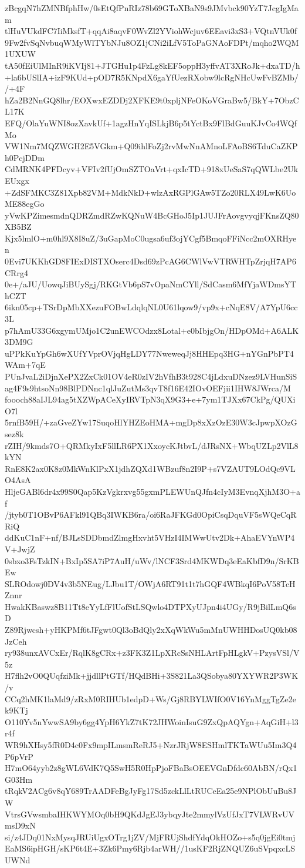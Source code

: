 zBcgqN7hZMNBfphHw/0sEtQfPnRIz78b69GToXBaN9s9JMvbck90YzT7JcgIgMam
tlHuVUkdFC7IiMksfT+qqAi8aqvF0WvZl2YViohWcjuv6EEavi3xS3+VQtnVUk0f
9Fw2fvSqNvbuqWMyWlTYbNJu8OZ1jCNi2iLfV5ToPaGNAoFDPt/mqho2WQM1UXUW
tA50fEiUlMInR9iKVIj81+JTGHu1p4FzLg8kEF5oppH3yffvAT3XRoJk+dxaTD/h
+la6bUSlIA+izF9KUd+pOD7R5KNpdX6gaYfUezRXobw9lcRgNHcUwFvBZMb//+4F
hZa2B2NnGQ8lhr/EOXwxEZDDj2XFKE9t0xpljNFeOKoVGraBw5/BkY+7ObzCL17K
EFQ/OlaYuWNI8ozXavkUf+1agzHnYqISLkjB6p5tYctBx9FlBdGuuKJvCo4WQfMo
VW1Nm7MQZWGH2E5VGkm+Q09ihlFoZj2rvMwNnAMnoLFAoBS6TduCaZKPh0PcjDDm
CdMRNK4PFDcyv+VFIv2fUjOmSZTOaVrt+qxIcTD+918xUeSaS7qQWLbe2UkEUxgx
+ZdSFMKC3Z81Xpb82VM+MdkNkD+wlzAxRGPlGAw5TZo20RLX49LwK6UoME88egGo
yVwKPZimesmdnQDRZmdRZwKQNuW4BcGHoJ5Ip1JUJFrAovgvyqjFKnsZQ80XB5BZ
Kjx5lmlO+m0hl9X8I8uZ/3uGapMoC0ugsa6uf3ojYCgf5BmqoFFiNcc2mOXRHyen
0Evi7UKKhGD8FIExDISTXOserc4Dsd69zPcAG6CWlVwVTRWHTpZrjqH7AP6CRrg4
0e+/aJU/UowqJiBUySgj/RKGtVb6pS7vOpaNmCYll/SdCasm6MfYjaWDmsYThCZT
6ikn05cp+TSrDpMbXXezuFOBwLdqlqNL0U61lqow9/vp9x+cNqE8V/A7YpU6cc3L
p7hAmU33G6xgymUMjo1C2unEWCOdzx8Lotal+e0bIbjgOn/HDpOMd+A6ALK3DM9G
uPPkKuYpGh6wXUfYVprOVjqHgLDY77NweweqJj8HHEpq3HG+nYGnPbPT4WAm+7qE
PUnJvaL2iDjnXePX2ZxCk01OV4eR0zIV2hVfhB3t928C4jLdxuDNzez9LVHunSiS
ag4F9s9htsoNn98BlPDNnc1qlJuZutMs3qvT8f16E42IOvOEFjii1IHW8JWrca/M
foooch88aIJL94ag5tXZWpACeXyIRVTpN3qX9G3+e+7ym1TJXx67CkPg/QUXiO7l
5rnfB59H/+zaGveZYw17SuqoHlYHZEoHMA+mgDp8xXzOzE30W3cJpwpXOzGsez8k
rZIH/9kmds7O+QRMkyIxF5llLR6PX1XxoycKJtbvL/dJRsNX+WbqUZLp2VlL8kYN
RnE8K2ax0K8z0MkWnKlPxX1jdhZQXd1WBzuf8n2I9P+s7VZAUT9LOdQc9VLO4AsA
HljeGABl6dr4x99S0Qap5KzVgkrxvg55gxmPLEWUnQJfn4cIyM3EvnqXjhM3O+af
/jtyb0T1OBvP6AFkl91QBq3IWKB6ra/oi6RaJFKGd0OpiCsqDquVF5sWQeCqRRiQ
ddKuC1nF+nf/BJLsSDDbmdZlmgHxvht5VHzI4IMWwUtv2Dk+AhaEVYnWP4V+JwjZ
0sbxo3FsTzkIN+BxIp5SA7iP7AuH/uWv/lNCF3Srd4MKWDq3eEaKbfD9n/SrKBEw
SLROdowj0DV4v3b5NEug/LJbu1T/OWjA6RT91t1t7hGQF4WBkqI6PoV58TcHZnnr
HwakKBaswz8B11Tt8eYyLfFlUofStLSQwlo4DTPXyUJpn4i4UGy/R9jBilLmQ6sD
Z89Rjwcsh+yHKPMf6tJFgwt0Ql3oBdQly2xXqWkWu5mMnUWHHDosUQ0kb08JzCeh
ry938unxAVCxEr/RqlK8gCRx+z3FK3Z1LpXRcSsNHLArtFpHLgkV+PzysVSl/V5z
H7flh2vO0QUqfziMk+jjdllPtGTf/HQdBHi+3S821La3QSobya80YXYWR2P3WK/v
CCq2hMK1laMd9/zRxM0RIHUb1edpD+Ws/Gj8RBYLWIfO0V16YnMggTgZe2ek9KTj
O110Yv5nYwwSA9by6gg4YpH6YkZ7tK72JHWoinIsuG9ZxQpAQYgn+AqGiH+l3r4f
WR9hXHsy5fR0D4c0Fx9mpILmsmReRJ5+NzrJRjW8ESHmlTKTaWUu5Im3Q4P6pVrP
H7mO64yyb2z8gWL6VdK7Q5SwH5R0HpPjoFBaBsOEEVGnDfdc60AbBN/rQx1G03Hm
tRqkV2ACg6v8qY689TrAADFeBgJyFg17Sd5zckLlLtRUCeEa25e9NPlObUuBu8JW
VtrsGVwsmbaIHKWYMOq0bH9QKdJgEJ3ybqyJte2mmylVzUfJxT7VLWRvUVmsD9xN
si/z4JDq01NxMysqJRUiUgxOTrg1jZV/MjFRUjShdfYdqOkHOZo+s5q0jgEi0tmj
EaMS6ipHGH/sKP6t4E+3Zk6Pmy6Rjb4arWH//1usKF2RjZNQUZ6uSVpqxcLSUWNd

